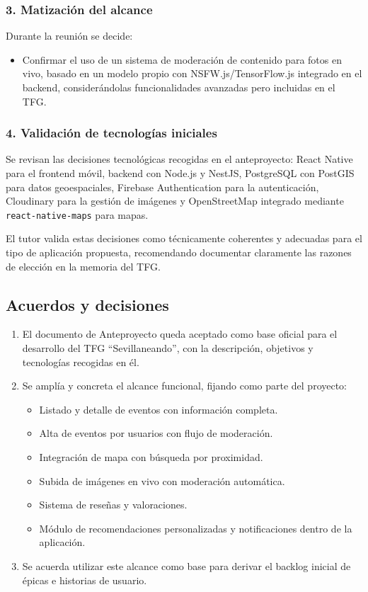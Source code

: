 \subsubsection*{3. Matización del alcance}
Durante la reunión se decide:

\begin{itemize}
    \item Confirmar el uso de un sistema de moderación de contenido para fotos en vivo, basado en un modelo propio con NSFW.js/TensorFlow.js integrado en el backend, considerándolas funcionalidades avanzadas pero incluidas en el TFG.
\end{itemize}

\subsubsection*{4. Validación de tecnologías iniciales}
Se revisan las decisiones tecnológicas recogidas en el anteproyecto: React Native para el frontend móvil, backend con Node.js y NestJS, PostgreSQL con PostGIS para datos geoespaciales, Firebase Authentication para la autenticación, Cloudinary para la gestión de imágenes y OpenStreetMap integrado mediante \texttt{react-native-maps} para mapas.

El tutor valida estas decisiones como técnicamente coherentes y adecuadas para el tipo de aplicación propuesta, recomendando documentar claramente las razones de elección en la memoria del TFG.

\subsection*{Acuerdos y decisiones}
\begin{enumerate}
    \item El documento de Anteproyecto queda aceptado como base oficial para el desarrollo del TFG ``Sevillaneando'', con la descripción, objetivos y tecnologías recogidas en él.
    \item Se amplía y concreta el alcance funcional, fijando como parte del proyecto:
    \begin{itemize}
        \item Listado y detalle de eventos con información completa.
        \item Alta de eventos por usuarios con flujo de moderación.
        \item Integración de mapa con búsqueda por proximidad.
        \item Subida de imágenes en vivo con moderación automática.
        \item Sistema de reseñas y valoraciones.
        \item Módulo de recomendaciones personalizadas y notificaciones dentro de la aplicación.
    \end{itemize}
    \item Se acuerda utilizar este alcance como base para derivar el backlog inicial de épicas e historias de usuario.
\end{enumerate}


